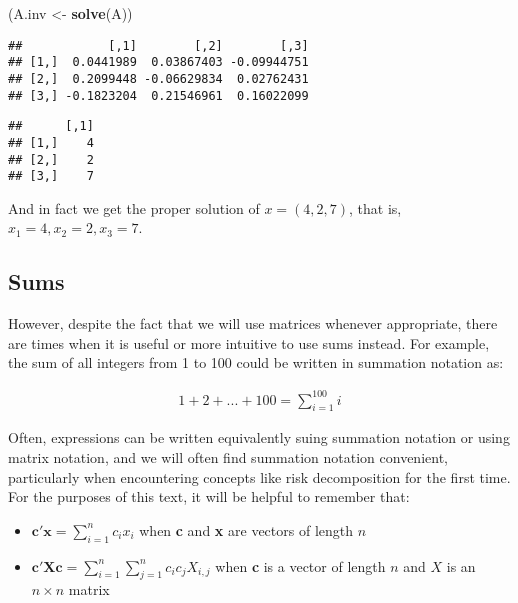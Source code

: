 \documentclass[]{book}
\newenvironment{Shaded}{\begin{snugshade}}{\end{snugshade}}
\newcommand{\KeywordTok}[1]{\textcolor[rgb]{0.13,0.29,0.53}{\textbf{#1}}}
\newcommand{\StringTok}[1]{\textcolor[rgb]{0.31,0.60,0.02}{#1}}
\newcommand{\OperatorTok}[1]{\textcolor[rgb]{0.81,0.36,0.00}{\textbf{#1}}}
\newcommand{\NormalTok}[1]{#1}
\providecommand{\tightlist}{%
  \setlength{\itemsep}{0pt}\setlength{\parskip}{0pt}}
\theoremstyle{definition}
\theoremstyle{definition}
\theoremstyle{definition}
\theoremstyle{remark}
\begin{document}
\begin{Shaded}
\begin{Highlighting}[]
\NormalTok{(A.inv <-}\StringTok{ }\KeywordTok{solve}\NormalTok{(A))}
\end{Highlighting}
\end{Shaded}

\begin{verbatim}
##            [,1]        [,2]        [,3]
## [1,]  0.0441989  0.03867403 -0.09944751
## [2,]  0.2099448 -0.06629834  0.02762431
## [3,] -0.1823204  0.21546961  0.16022099
\end{verbatim}

\begin{Shaded}
\end{Shaded}

\begin{verbatim}
##      [,1]
## [1,]    4
## [2,]    2
## [3,]    7
\end{verbatim}

And in fact we get the proper solution of \(x = (4, 2, 7)\), that is,
\(x_1 = 4, x_2 = 2, x_3 = 7\).

\subsection*{Sums}\label{sums}

However, despite the fact that we will use matrices whenever
appropriate, there are times when it is useful or more intuitive to use
sums instead. For example, the sum of all integers from 1 to 100 could
be written in summation notation as:

\begin{align*}
1 + 2 + ... + 100 = \displaystyle\sum_{i=1}^{100} i
\end{align*}

Often, expressions can be written equivalently suing summation notation
or using matrix notation, and we will often find summation notation
convenient, particularly when encountering concepts like risk
decomposition for the first time. For the purposes of this text, it will
be helpful to remember that:

\begin{itemize}
\tightlist
\item
  \(\textbf{c}'\textbf{x} = \displaystyle\sum_{i=1}^{n} c_i x_i\) when
  \textbf{c} and \textbf{x} are vectors of length \(n\)
\item
  \(\textbf{c}' \textbf{X} \textbf{c} = \displaystyle\sum_{i=1}^{n} \displaystyle\sum_{j=1}^{n} c_i c_j X_{i,j}\)
  when \textbf{c} is a vector of length \(n\) and \(X\) is an
  \(n \times n\) matrix
\end{itemize}
\end{document}
